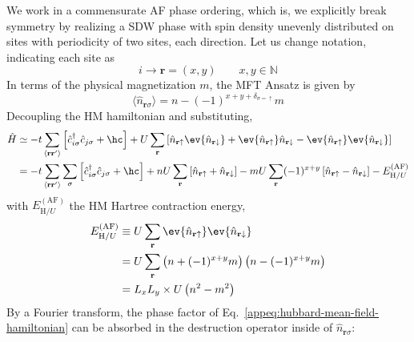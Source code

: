 We work in a commensurate AF phase ordering, which is, we explicitly break symmetry by realizing a SDW phase with spin density unevenly distributed on sites with periodicity of two sites, each direction. Let us change notation, indicating each site as
\[
	i \to \mathbf{r} = (x,y)
	\qquad
	x,y \in \mathbb{N}
\]
In terms of the physical magnetization $m$, the MFT Ansatz is given by
\begin{equation}\label{appeq:af-mean-field-ansatz}
	\langle \hat n_{\mathbf{r}\sigma} \rangle = n - (-1)^{x+y+\delta_{\sigma=\uparrow}} m
\end{equation}
Decoupling the HM hamiltonian and substituting,
\begin{align}
	\hat H &\simeq -t \sum_{\langle \mathbf{r} \mathbf{r}' \rangle} \left[
		\hat c_{i\sigma}^\dagger \hat c_{j\sigma} + \hc
	\right] + U \sum_\mathbf{r} \left[
		\hat n_{\mathbf{r}\uparrow} \ev{\hat n_{\mathbf{r}\downarrow}} + \ev{\hat n_{\mathbf{r}\uparrow}} \hat n_{\mathbf{r}\downarrow} - \ev{\hat n_{\mathbf{r}\uparrow}} \ev{\hat n_{\mathbf{r}\downarrow}}
	\right] \nonumber \\
	&= -t \sum_{\langle \mathbf{r}\mathbf{r}' \rangle} \sum_\sigma \left[
		\hat c_{i\sigma}^\dagger \hat c_{j\sigma} + \hc
	\right]
	+ nU \sum_\mathbf{r} \left[
		\hat n_{\mathbf{r}\uparrow} + \hat n_{\mathbf{r}\downarrow}
	\right] - mU \sum_\mathbf{r} (-1)^{x+y} \left[
		\hat n_{\mathbf{r}\uparrow} - \hat n_{\mathbf{r}\downarrow}
	\right] - E_{\mathrm{H}/U}^{(\mathrm{AF})} \label{appeq:hubbard-mean-field-hamiltonian}
\end{align}
with $E_{\mathrm{H}/U}^{(\mathrm{AF})}$ the HM Hartree contraction energy,
\begin{align}
	E_{\mathrm{H}/U}^{(\mathrm{AF})} &\equiv U \sum_\mathbf{r} \ev{\hat n_{\mathbf{r}\uparrow}} \ev{\hat n_{\mathbf{r}\downarrow}} \nonumber \\
	&= U \sum_\mathbf{r} \left(
		n + (-1)^{x+y} m
	\right) \left(
		n - (-1)^{x+y} m
	\right) \nonumber \\
	&= L_x L_y \times U \left(
		n^2 - m^2
	\right) \label{appeq:af-hartree-V-contraction-energy}
\end{align}
By a Fourier transform, the phase factor of Eq.~\eqref{appeq:hubbard-mean-field-hamiltonian} can be absorbed in the destruction operator inside of $\hat n_{\mathbf{r}\sigma}$:
